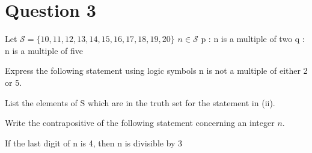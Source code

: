 

\section*{Question 3}

Let $\mathcal{S} = \{10,11,12,13,14,15,16,17,18,19,20\}$
$n  \in \mathcal{S}$
p : n is a multiple of two
q : n is a multiple of five

Express the following statement using logic symbols
n is not a multiple of either 2 or 5.

List the elements of S which are in the truth set for the statement in (ii).

Write the contrapositive of the following statement concerning an integer $n$.

If the last digit of n is 4, then n is divisible by 3